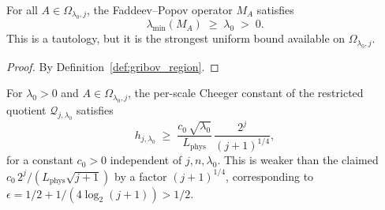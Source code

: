 \begin{lemma}
\label{lem:restricted_spectral_gap}
For all $A\in\Omega_{\lambda_{0},j}$, the Faddeev--Popov
operator $M_{A}$ satisfies
\begin{equation}
\label{eq:restricted_spectral_gap}
  \lambda_{\min}(M_{A})\;\ge\;\lambda_{0}
  \;>\;0.
\end{equation}
This is a tautology, but it is the strongest uniform bound
available on $\Omega_{\lambda_{0},j}$.
\end{lemma}

\begin{proof}
By Definition~\ref{def:gribov_region}.
\end{proof}

\begin{theorem}
\label{thm:gribov_restricted_cheeger}
For $\lambda_{0}>0$ and $A\in\Omega_{\lambda_{0},j}$, the
per-scale Cheeger constant of the restricted quotient
$\mathcal{Q}_{j,\lambda_{0}}$ satisfies
\begin{equation}
\label{eq:gribov_restricted_bound}
  h_{j,\lambda_{0}}
  \;\ge\;\frac{c_{0}\,\sqrt{\lambda_{0}}}{L_{\mathrm{phys}}}\,
  \frac{2^{j}}{(j+1)^{1/4}},
\end{equation}
for a constant $c_{0}>0$ independent of $j,n,\lambda_{0}$. This
is weaker than the claimed
$c_{0}\,2^{j}/(L_{\mathrm{phys}}\sqrt{j+1})$ by a factor
$(j+1)^{1/4}$, corresponding to $\epsilon=1/2+1/(4\log_{2}(j+1))
>1/2$.
\end{theorem}

